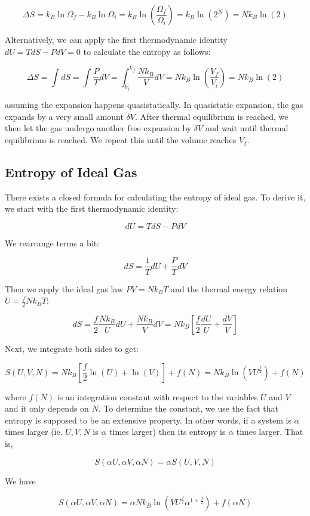 \[\Delta S=k_B\ln\Omega_f-k_B\ln\Omega_i=k_B\ln\left(\frac{\Omega_f}{\Omega_i}\right)=k_B\ln(2^N)=Nk_B\ln(2)\]

Alternatively, we can apply the first thermodynamic identity $dU=TdS-PdV=0$ to calculate the entropy as follows:

\[\Delta S=\int dS=\int \frac{P}{T} dV=\int_{V_i}^{V_f} \frac{Nk_B}{V} dV=Nk_B\ln\left(\frac{V_f}{V_i}\right)=Nk_B\ln(2)\]

assuming the expansion happens quasistatically. In quasistatic expansion, the gas expands by a very small amount $\delta V$. After thermal equilibrium is reached, we then let the gas undergo another free expansion by $\delta V$ and wait until thermal equilibrium is reached. We repeat this until the volume reaches $V_f$.

\subsection{Entropy of Ideal Gas}

There exists a closed formula for calculating the entropy of ideal gas. To derive it, we start with the first thermodynamic identity:

\[dU=TdS-PdV\]

We rearrange terms a bit:

\[dS=\frac{1}{T}dU+\frac{P}{T}dV\]

Then we apply the ideal gas law $PV=Nk_BT$ and the thermal energy relation $U=\frac{f}{2} Nk_BT$:

\[dS=\frac{f}{2}\frac{Nk_B}{U}dU+\frac{Nk_B}{V}dV=Nk_B\left[ \frac{f}{2}\frac{dU}{U}+\frac{dV}{V} \right]\]

Next, we integrate both sides to get:

\[S(U,V,N)=Nk_B\left[ \frac{f}{2}\ln(U)+\ln(V) \right]+f(N)=Nk_B\ln\left(VU^\frac{f}{2}\right)+f(N)\]

where $f(N)$ is an integration constant with respect to the variables $U$ and $V$ and it only depends on $N$. To determine the constant, we use the fact that entropy is supposed to be an extensive property. In other words, if a system is $\alpha$ times larger (ie. $U,V,N$ is $\alpha$ times larger) then its entropy is $\alpha$ times larger. That is,

\[S(\alpha U,\alpha V,\alpha N)=\alpha S(U,V,N)\]

We have

\[S(\alpha U,\alpha V,\alpha N)=\alpha Nk_B\ln\left(VU^\frac{f}{2} \alpha^{1+\frac{f}{2}}\right)+f(\alpha N)\]

